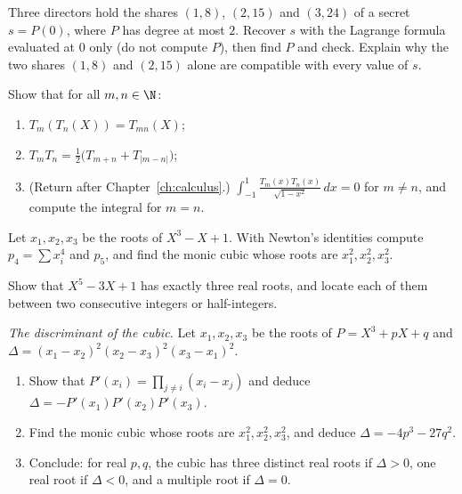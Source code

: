 \begin{exercise}[$\star\star$]\label{ex:secret}
Three directors hold the shares $(1,8)$, $(2,15)$ and $(3,24)$ of a secret $s=P(0)$, where $P$ has degree at most $2$. Recover $s$ with the
Lagrange formula evaluated at $0$ only (do not compute $P$), then find $P$ and check. Explain why the two shares $(1,8)$ and $(2,15)$ alone are
compatible with every value of $s$.
\end{exercise}

\begin{exercise}[$\star\star$]\label{ex:chebprod}
Show that for all $m,n\in\N$:
\begin{enumerate}[label=(\alph*)]
\item $T_m(T_n(X))=T_{mn}(X)$;
\item $T_mT_n=\frac12\bigl(T_{m+n}+T_{|m-n|}\bigr)$;
\item (Return after Chapter~\ref{ch:calculus}.) $\displaystyle\int_{-1}^1\frac{T_m(x)T_n(x)}{\sqrt{1-x^2}}\,dx=0$ for $m\ne n$, and compute the integral for $m=n$.
\end{enumerate}
\end{exercise}

\begin{exercise}[$\star\star$]\label{ex:newtonid}
Let $x_1,x_2,x_3$ be the roots of $X^3-X+1$. With Newton's identities compute $p_4=\sum x_i^4$ and $p_5$, and find the monic cubic whose roots are
$x_1^2,x_2^2,x_3^2$.
\end{exercise}

\begin{exercise}[$\star\star$]\label{ex:descartes}
Show that $X^5-3X+1$ has exactly three real roots, and locate each of them between two consecutive integers or half-integers.
\end{exercise}

\begin{exercise}[$\star\star\star$]\label{ex:disc}
\emph{The discriminant of the cubic.} Let $x_1,x_2,x_3$ be the roots of $P=X^3+pX+q$ and $\Delta=(x_1-x_2)^2(x_2-x_3)^2(x_3-x_1)^2$.
\begin{enumerate}[label=(\alph*)]
\item Show that $P'(x_i)=\prod_{j\ne i}(x_i-x_j)$ and deduce $\Delta=-P'(x_1)P'(x_2)P'(x_3)$.
\item Find the monic cubic whose roots are $x_1^2,x_2^2,x_3^2$, and deduce $\Delta=-4p^3-27q^2$.
\item Conclude: for real $p,q$, the cubic has three distinct real roots if $\Delta>0$, one real root if $\Delta<0$, and a multiple root if $\Delta=0$.
\end{enumerate}
\end{exercise}


